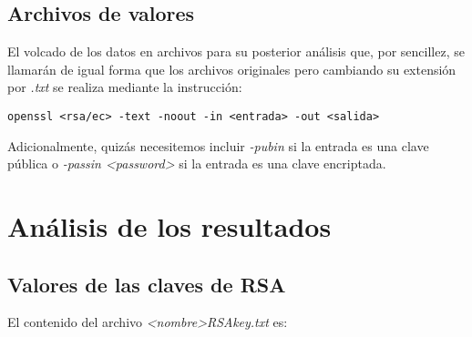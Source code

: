 \documentclass[a4paper, 11pt]{article}
\begin{document}
	\subsection{Archivos de valores}
		El volcado de los datos en archivos para su posterior análisis que, por sencillez, se llamarán de igual forma que los
		archivos originales pero cambiando su extensión por \textit{.txt} se realiza mediante la instrucción: \\
		\begin{small}
			\verb|openssl <rsa/ec> -text -noout -in <entrada> -out <salida>|
		\end{small}

		Adicionalmente, quizás necesitemos incluir \textit{-pubin} si la entrada es una clave pública o
		\textit{-passin <password>} si la entrada es una clave encriptada.

\section{Análisis de los resultados}
	\subsection{Valores de las claves de RSA}
		El contenido del archivo \textit{<nombre>RSAkey.txt} es:
		
		
\end{document}
